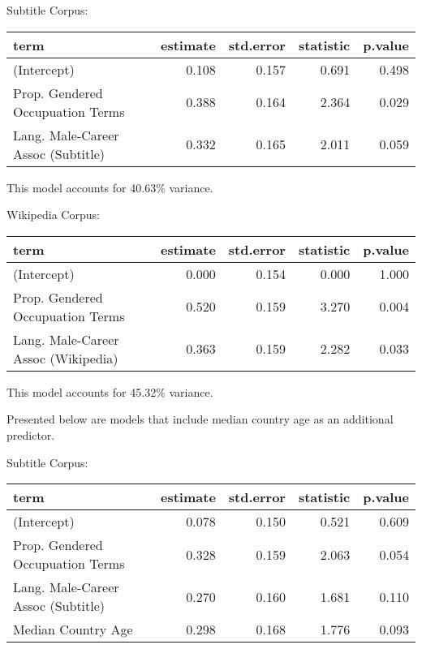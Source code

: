\documentclass[]{article}
\begin{document}
Subtitle Corpus:

\begin{table}[H]
\centering\begingroup\fontsize{9}{11}\selectfont

\begin{tabular}{l|r|r|r|r}
\hline
term & estimate & std.error & statistic & p.value\\
\hline
(Intercept) & 0.108 & 0.157 & 0.691 & 0.498\\
\hline
Prop. Gendered Occupuation Terms & 0.388 & 0.164 & 2.364 & 0.029\\
\hline
Lang. Male-Career Assoc (Subtitle) & 0.332 & 0.165 & 2.011 & 0.059\\
\hline
\end{tabular}
\endgroup{}
\end{table}

This model accounts for 40.63\% variance.

Wikipedia Corpus:

\begin{table}[H]
\centering\begingroup\fontsize{9}{11}\selectfont

\begin{tabular}{l|r|r|r|r}
\hline
term & estimate & std.error & statistic & p.value\\
\hline
(Intercept) & 0.000 & 0.154 & 0.000 & 1.000\\
\hline
Prop. Gendered Occupuation Terms & 0.520 & 0.159 & 3.270 & 0.004\\
\hline
Lang. Male-Career Assoc (Wikipedia) & 0.363 & 0.159 & 2.282 & 0.033\\
\hline
\end{tabular}
\endgroup{}
\end{table}

This model accounts for 45.32\% variance.

Presented below are models that include median country age as an
additional predictor.

Subtitle Corpus:

\begin{table}[H]
\centering\begingroup\fontsize{9}{11}\selectfont

\begin{tabular}{l|r|r|r|r}
\hline
term & estimate & std.error & statistic & p.value\\
\hline
(Intercept) & 0.078 & 0.150 & 0.521 & 0.609\\
\hline
Prop. Gendered Occupuation Terms & 0.328 & 0.159 & 2.063 & 0.054\\
\hline
Lang. Male-Career Assoc (Subtitle) & 0.270 & 0.160 & 1.681 & 0.110\\
\hline
Median Country Age & 0.298 & 0.168 & 1.776 & 0.093\\
\hline
\end{tabular}
\endgroup{}
\end{table}
\end{document}
